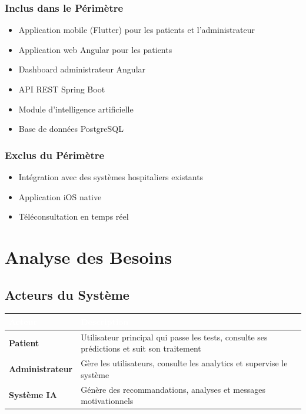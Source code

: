 \documentclass[12pt,a4paper]{report}
\begin{document}
\subsection{Inclus dans le Périmètre}
\begin{itemize}
    \item Application mobile (Flutter) pour les patients et l'administrateur
    \item Application web Angular pour les patients
    \item Dashboard administrateur Angular
    \item API REST Spring Boot
    \item Module d'intelligence artificielle
    \item Base de données PostgreSQL
\end{itemize}

\subsection{Exclus du Périmètre}
\begin{itemize}
    \item Intégration avec des systèmes hospitaliers existants
    \item Application iOS native
    \item Téléconsultation en temps réel
\end{itemize}

\newpage

\chapter{Analyse des Besoins}

\section{Acteurs du Système}

\begin{tabularx}{\textwidth}{|l|X|}
    \hline
    \rowcolor{emsiblue}\textcolor{white}{\textbf{Acteur}} & \textcolor{white}{\textbf{Description}} \\
    \hline
    \textbf{Patient} & Utilisateur principal qui passe les tests, consulte ses prédictions et suit son traitement \\
    \hline
    \textbf{Administrateur} & Gère les utilisateurs, consulte les analytics et supervise le système \\
    \hline
    \textbf{Système IA} & Génère des recommandations, analyses et messages motivationnels \\
    \hline
\end{tabularx}
\end{document}
